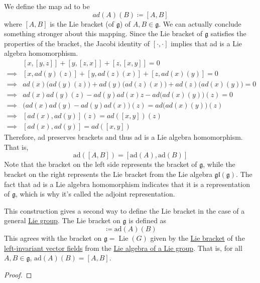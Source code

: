\documentclass{article}
\DeclareMathOperator{\Lie}{Lie}
\newcounter{definition}[section]
\begin{document}
\begin{definition}
      We define the map ad to be 
      \begin{equation}
        ad(A)(B) \coloneqq [A,B]
      \end{equation}
      where $[A,B]$ is the Lie bracket (of $\mathfrak{g}$) of $A, B \in \mathfrak{g}$. We can actually conclude something stronger about this mapping. Since the Lie bracket of $\mathfrak{g}$ satisfies the properties of the bracket, the Jacobi identity of $[\cdot, \cdot]$ implies that ad is a Lie algebra homomorphism. 
      \begin{align*}
        & [x, [y,z]] + [y,[z,x]] + [z, [x,y]] = 0 \\
        \implies & [x, ad(y)(z)] + [y, ad(z)(x)] + [z, ad(x)(y)] = 0 \\
        \implies & ad(x)\big(ad(y)(z)\big) + ad(y) \big( ad(z)(x)\big) + ad(z) \big(ad(x)(y)\big) = 0 \\
        \implies & ad(x) ad(y) (z) - ad(y) ad(x) z - ad \big(ad(x)(y)\big) (z) = 0 \\
        \implies & \big( ad(x) ad(y) - ad(y) ad(x) \big) (z) = ad\big( ad(x)(y) \big) (z) \\
        \implies & [ad(x), ad(y)] (z) = ad ([x,y]) (z) \\
        \implies & [ad(x), ad(y)] = ad([x,y])
      \end{align*}
      Therefore, ad preserves brackets and thus ad is a Lie algebra homomorphism. That is, 
      \begin{equation}
        \text{ad}([A,B]) = [\text{ad}(A), \text{ad}(B)]
      \end{equation}
      Note that the bracket on the left side represents the bracket of $\mathfrak{g}$, while the bracket on the right represents the Lie bracket from the Lie algebra $\mathfrak{gl}(\mathfrak{g})$. The fact that ad is a Lie algebra homomorphism indicates that it is a representation of $\mathfrak{g}$, which is why it's called the adjoint representation. 
    \end{definition}

    \begin{definition}
      \label{def:lie-bracket-on-a-general-lie-group}
      This construction gives a second way to define the Lie bracket in the case of a general \hyperref[def:lie-group]{Lie group}. The Lie bracket on $\mathfrak{g}$ is defined as 
      \begin{equation}
        [A,B] \coloneqq \text{ad} (A) (B)
      \end{equation}
      This agrees with the bracket on $\mathfrak{g} = \Lie(G)$ given by the \hyperref[def:lie-bracket]{Lie bracket} of the \hyperref[def:left-invariant-vector-field]{left-invariant vector fields} from the \hyperref[def:lie-algebra-of-a-lie-group]{Lie algebra of a Lie group}. That is, for all $A, B \in \mathfrak{g}$, $\text{ad}(A)(B) = [A, B]$. 
    \end{definition}
    \begin{proof}
      
    \end{proof}
\end{document}
